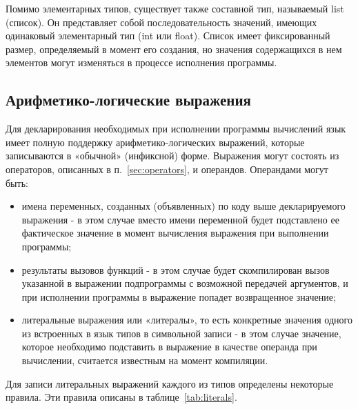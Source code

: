 Помимо элементарных типов, существует также составной тип, называемый list (список).
Он представляет собой последовательность значений, имеющих одинаковый элементарный тип (int или float).
Список имеет фиксированный размер, определяемый в момент его создания, но значения содержащихся в нем элементов могут изменяться в процессе исполнения программы.

\subsection{Арифметико-логические выражения}

Для декларирования необходимых при исполнении программы вычислений язык имеет полную поддержку арифметико-логических выражений, которые записываются в «обычной» (инфиксной) форме.
Выражения могут состоять из операторов, описанных в п.~\ref{sec:operators}, и операндов.
Операндами могут быть:

\begin{itemize}
    \item имена переменных, созданных (объявленных) по коду выше декларируемого выражения - в этом случае вместо имени переменной будет подставлено ее фактическое значение в момент вычисления выражения при выполнении программы;
    \item результаты вызовов функций - в этом случае будет скомпилирован вызов указанной в выражении подпрограммы с возможной передачей аргументов, и при исполнении программы в выражение попадет возвращенное значение;
    \item литеральные выражения или «литералы», то есть конкретные значения одного из встроенных в язык типов в символьной записи - в этом случае значение, которое необходимо подставить в выражение в качестве операнда при вычислении, считается известным на момент компиляции.
\end{itemize}

Для записи литеральных выражений каждого из типов определены некоторые правила.
Эти правила описаны в таблице~\ref{tab:literals}.

